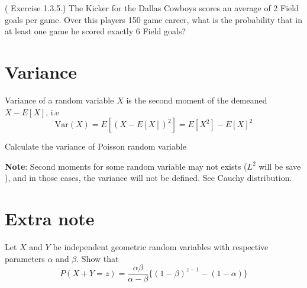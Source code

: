 \begin{eg}
    (\cite{IntroPanchenko} Exercise 1.3.5.) The Kicker for the Dallas Cowboys scores
an average of 2 Field goals per game. Over this players 150
game career, what is the probability that in at least one game
he scored exactly 6 Field goals?
    
\end{eg}

\section{Variance}
Variance of a random variable \(X\) is the second moment of the demeaned \(X-E[X]\), i.e
\[
    \text{Var} (X) = E[(X-E[X])^2] = E[X^2] - E[X]^2
\]
\begin{eg}
    Calculate the variance of Poisson random variable
\end{eg}
\textbf{Note}: Second moments for some random variable may not exists (\(L^2\) will be save ), and in those cases, the variance will not be defined. See Cauchy distribution.

\section{Extra note}
\begin{exercise}
    Let \(X\) and \(Y\) be independent geometric random variables with respective parameters \(\alpha\) and \(\beta \). Show that  
    \[
        P(X+Y = z) = \frac{\alpha \beta }{\alpha -\beta} \{(1-\beta)^{z-1} - (1 - \alpha ) \}
    \]
\end{exercise}


